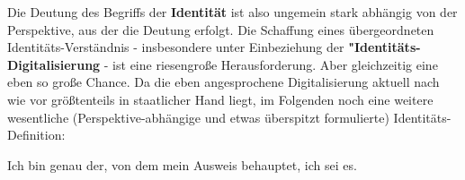 \vspace{0.3cm}


\vspace{0.3cm}

Die Deutung des Begriffs der \textbf{Identität} ist also ungemein stark abhängig von der Perspektive, aus der die Deutung erfolgt. Die Schaffung eines übergeordneten Identitäts-Verständnis - insbesondere unter Einbeziehung der \textbf{"Identitäts-Digitalisierung} - ist eine riesengroße Herausforderung. Aber gleichzeitig eine eben so große Chance. Da die eben angesprochene Digitalisierung aktuell nach wie vor größtenteils in staatlicher Hand liegt, im Folgenden noch eine weitere wesentliche (Perspektive-abhängige und etwas überspitzt formulierte) Identitäts-Definition: 

\vspace{0.3cm}

\begin{Business-Def}\label{defStaatIdentity}

Ich bin genau der, von dem mein Ausweis behauptet, ich sei es.

\end{Business-Def}

\vspace{0.5cm}
